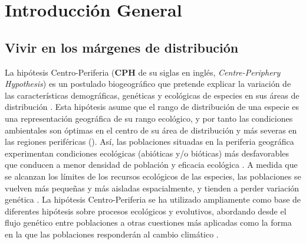 %

\chapter{\textcolor{ctcolormain}{Introducción General}}\label{sec:intro}
\newpage

\section{Vivir en los márgenes de distribución}\label{sec:intro:rear-edge}

La hipótesis Centro-Periferia (\textbf{CPH} de su siglas en inglés, \textit{Centre-Periphery Hypothesis}) es un postulado biogeográfico que pretende explicar la variación de las características demográficas, genéticas y ecológicas de especies en sus áreas de distribución \autocite{Sextonetal2009EvolutionEcology, Pirononetal2015GeographicClimatic}. Esta hipótesis asume que el rango de distribución de una especie es una representación geográfica de su rango ecológico, y por tanto las condiciones ambientales son óptimas en el centro de su área de distribución y más severas en las regiones periféricas \autocite{Pirononetal2017GeographicVariation}(). Así, las poblaciones situadas en la periferia geográfica experimentan condiciones ecológicas (abióticas y/o bióticas) más desfavorables que conducen a menor densidad de población y eficacia ecológica \autocite[\textit{fitness},][]{Brown1984RelationshipAbundance}. A medida que se alcanzan los límites de los recursos ecológicos de las especies, las poblaciones se vuelven más pequeñas y más aisladas espacialmente, y tienden a perder variación genética \autocites[][]{Karketal2008HowDoes,Garciaetal2010LivingEdge}. La hipótesis Centro-Periferia se ha utilizado ampliamente como base de diferentes hipótesis sobre procesos ecológicos y evolutivos, abordando desde el flujo genético entre poblaciones a otras cuestiones más aplicadas como la forma en la que las poblaciones responderán al cambio climático \autocites{SagarinGaines2002AbundantCentre}. 

